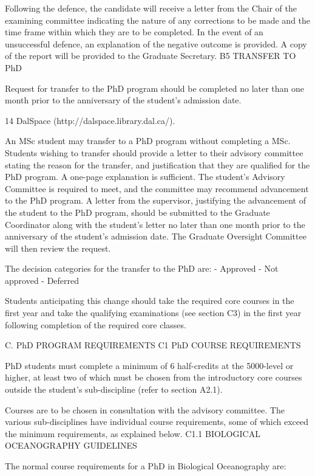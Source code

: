 Following the defence, the candidate will receive a letter from the Chair of the examining committee indicating the nature of any corrections to be made and the time frame within which they are to be completed. In the event of an unsuccessful defence, an explanation of the negative outcome is provided. A copy of the report will be provided to the Graduate Secretary.
B5	TRANSFER TO PhD

Request for transfer to the PhD program should be completed no later than one month prior to the anniversary of the student’s admission date.



14 DalSpace (http://dalspace.library.dal.ca/).
 

An MSc student may transfer to a PhD program without completing a MSc. Students wishing to transfer should provide a letter to their advisory committee stating the reason for the transfer, and justification that they are qualified for the PhD program. A one-page explanation is sufficient. The student’s Advisory Committee is required to meet, and the committee may recommend advancement to the PhD program. A letter from the supervisor, justifying the advancement of the student to the PhD program, should be submitted to the Graduate Coordinator along with the student’s letter no later than one month prior to the anniversary of the student’s admission date. The Graduate Oversight Committee will then review the request.

The decision categories for the transfer to the PhD are:
-	Approved
-	Not approved
-	Deferred

Students anticipating this change should take the required core courses in the first year and take the qualifying examinations (see section C3) in the first year following completion of the required core classes.

C.	PhD  PROGRAM REQUIREMENTS
C1	PhD COURSE REQUIREMENTS

PhD students must complete a minimum of 6 half-credits at the 5000-level or higher, at least two of which must be chosen from the introductory core courses outside the student’s sub-discipline (refer to section A2.1).

Courses are to be chosen in consultation with the advisory committee. The various sub-disciplines have individual course requirements, some of which exceed the minimum requirements, as explained below.
C1.1	BIOLOGICAL OCEANOGRAPHY GUIDELINES

The normal course requirements for a PhD in Biological Oceanography are:

